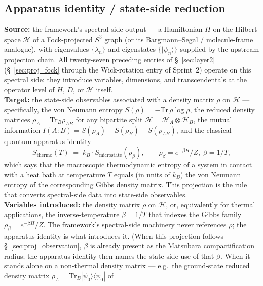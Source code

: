 \subsection{Apparatus identity / state-side reduction}
\label{sec:proj_apparatus_identity}
\textbf{Source:} the framework's spectral-side output --- a Hamiltonian
$H$ on the Hilbert space $\mathcal{H}$ of a Fock-projected $S^3$ graph
(or its Bargmann--Segal / molecule-frame analogue), with eigenvalues
$\{\lambda_n\}$ and eigenstates $\{|\psi_n\rangle\}$ supplied by the
upstream projection chain.  All twenty-seven preceding entries of
\S~\ref{sec:layer2} (\S~\ref{sec:proj_fock} through the Wick-rotation
entry of Sprint~2) operate on this spectral side: they introduce
variables, dimensions, and transcendentals at the operator level of
$H$, $D$, or $\mathcal{H}$ itself.\\
\textbf{Target:} the state-side observables associated with a density
matrix $\rho$ on $\mathcal{H}$ --- specifically, the von Neumann entropy
$S(\rho) = -\mathrm{Tr}\,\rho \log\rho$, the reduced density matrices
$\rho_A = \mathrm{Tr}_B \rho_{AB}$ for any bipartite split
$\mathcal{H} = \mathcal{H}_A \otimes \mathcal{H}_B$, the mutual
information $I(A{:}B) = S(\rho_A) + S(\rho_B) - S(\rho_{AB})$, and the
classical--quantum apparatus identity
\begin{equation*}
   S_\mathrm{thermo}(T) \;=\; k_B \cdot S_\mathrm{microstate}(\rho_\beta),
   \qquad \rho_\beta = e^{-\beta H} / Z, \; \beta = 1/T,
\end{equation*}
which says that the macroscopic thermodynamic entropy of a system in
contact with a heat bath at temperature $T$ equals (in units of
$k_B$) the von Neumann entropy of the corresponding Gibbs density
matrix.  This projection is the rule that converts spectral-side
data into state-side observables.\\
\textbf{Variables introduced:} the density matrix $\rho$ on
$\mathcal{H}$, or, equivalently for thermal applications, the
inverse-temperature $\beta = 1/T$ that indexes the Gibbs family
$\rho_\beta = e^{-\beta H}/Z$.  The framework's spectral-side
machinery never references $\rho$; the apparatus identity is what
introduces it.  (When this projection follows
\S~\ref{sec:proj_observation}, $\beta$ is already present as the
Matsubara compactification radius; the apparatus identity then names
the state-side use of that $\beta$.  When it stands alone on a
non-thermal density matrix --- e.g.\ the ground-state reduced density
matrix $\rho_A = \mathrm{Tr}_B |\psi_0\rangle\langle\psi_0|$ of

